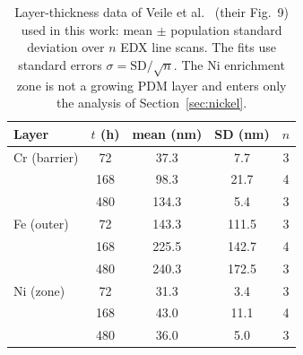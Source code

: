 \documentclass[pdflatex,sn-nature]{sn-jnl}
\begin{document}
\begin{table}[htbp]
\centering
\caption{Layer-thickness data of Veile et al.~\citep{veile2024} (their
Fig.~9) used in this work: mean $\pm$ population standard deviation
over $n$ EDX line scans. The fits use standard errors
$\sigma = \mathrm{SD}/\sqrt{n}$. The Ni enrichment zone is not a
growing PDM layer and enters only the analysis of
Section~\ref{sec:nickel}.}
\label{tab:data}
\begin{tabular}{lcccc}
\toprule
Layer & $t$ (h) & mean (nm) & SD (nm) & $n$ \\
\midrule
Cr (barrier) & 72 & 37.3 & 7.7 & 3 \\
 & 168 & 98.3 & 21.7 & 4 \\
 & 480 & 134.3 & 5.4 & 3 \\
Fe (outer) & 72 & 143.3 & 111.5 & 3 \\
 & 168 & 225.5 & 142.7 & 4 \\
 & 480 & 240.3 & 172.5 & 3 \\
Ni (zone) & 72 & 31.3 & 3.4 & 3 \\
 & 168 & 43.0 & 11.1 & 4 \\
 & 480 & 36.0 & 5.0 & 3 \\
\bottomrule
\end{tabular}
\end{table}
\end{document}
